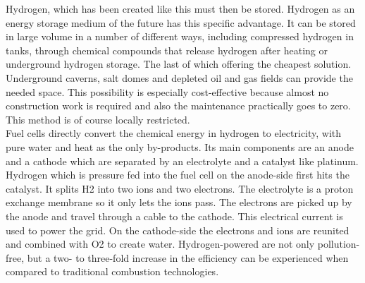 \documentclass[12pt,a4paper]{article}
\begin{document}
\begin{parcolumns}[colwidths={1=2.5 cm, 2=10 cm, 3=2.5cm}]{3}
{Hydrogen, which has been created like this must then be stored. Hydrogen as an energy storage medium of the future has this specific advantage. It can be stored in large volume in a number of different ways, including compressed hydrogen in tanks, through chemical compounds that release hydrogen after heating or underground hydrogen storage. The last of which offering the cheapest solution. Underground caverns, salt domes and depleted oil and gas fields can provide the needed space. This possibility is especially cost-effective because almost no construction work is required and also the maintenance practically goes to zero. This method is of course locally restricted.
\\
Fuel cells directly convert the chemical energy in hydrogen to electricity, with pure water and heat as the only by-products. Its main components are an anode and a cathode which are separated by an electrolyte and a catalyst like platinum. Hydrogen which is pressure fed into the fuel cell on the anode-side first hits the catalyst. It splits H2 into two ions and two electrons. The electrolyte is a proton exchange membrane so it only lets the ions pass. The electrons are picked up by the anode and travel through a cable to the cathode. This electrical current is used to power the grid. On the cathode-side the electrons and ions are reunited and combined with O2 to create water. Hydrogen-powered are not only pollution-free, but a two- to three-fold increase in the efficiency can be experienced when compared to traditional combustion technologies.
\\



}
\end{parcolumns}
\end{document}
